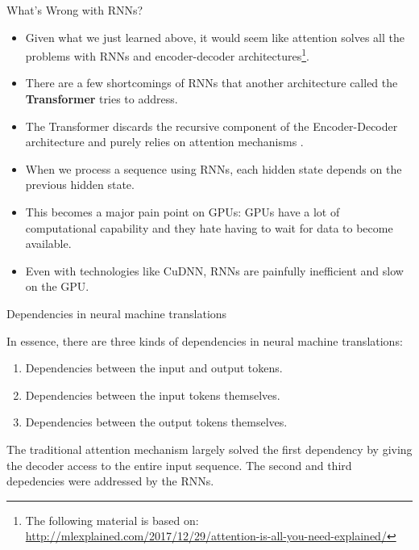 \documentclass[handout]{beamer}
\begin{document}
\begin{frame}{What's Wrong with RNNs?}
\begin{scriptsize}
\begin{itemize}
\item Given what we just learned above, it would seem like attention solves all the problems with RNNs and encoder-decoder architectures\footnote{The following material is based on: \url{http://mlexplained.com/2017/12/29/attention-is-all-you-need-explained/}}.

\item There are a few shortcomings of RNNs that another architecture called the \textbf{Transformer} tries to address.

\item The Transformer discards the recursive component of the Encoder-Decoder architecture and purely relies on attention mechanisms \cite{vaswani2017attention}.

\item When we process a sequence using RNNs, each hidden state depends on the previous hidden state. 

\item This becomes a major pain point on GPUs: GPUs have a lot of computational capability and they hate having to wait for data to become available.

\item Even with technologies like CuDNN, RNNs are painfully inefficient and slow on the GPU.


\end{itemize}
\end{scriptsize}
\end{frame}

\begin{frame}{Dependencies in neural machine translations}
\begin{scriptsize}
In essence, there are three kinds of dependencies in neural machine translations: 
\begin{enumerate}
\item Dependencies between the input and output tokens.

\item Dependencies between the input tokens themselves.

\item Dependencies between the output tokens themselves.
\end{enumerate}


The traditional attention mechanism largely solved the first dependency by giving the decoder access to the entire input sequence. The second and third depedencies were addressed by the RNNs.

\end{scriptsize}

\end{frame}
\end{document}
